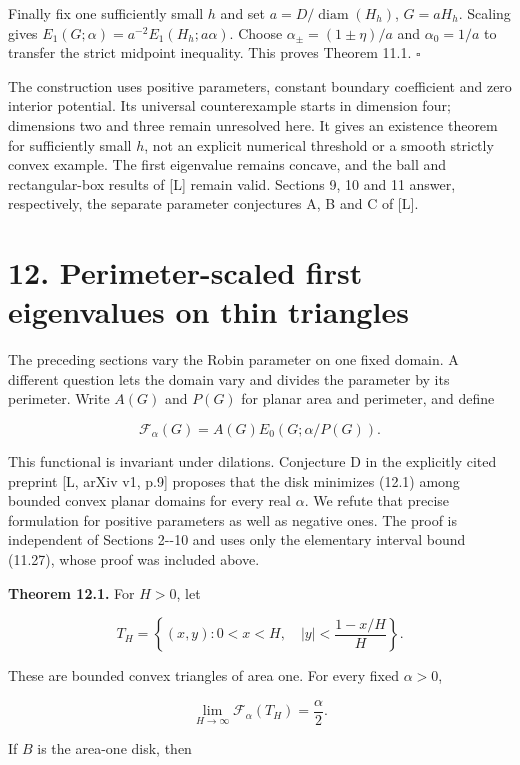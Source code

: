 \documentclass[11pt]{article}
\begin{document}
Finally fix one sufficiently small \(h\) and set
\(a=D/\operatorname{diam}(H_h)\), \(G=aH_h\). Scaling gives
\(E_1(G;\alpha)=a^{-2}E_1(H_h;a\alpha)\). Choose
\(\alpha_\pm=(1\pm\eta)/a\) and \(\alpha_0=1/a\) to transfer the strict
midpoint inequality. This proves Theorem 11.1. \(\square\)

The construction uses positive parameters, constant boundary coefficient
and zero interior potential. Its universal counterexample starts in
dimension four; dimensions two and three remain unresolved here. It
gives an existence theorem for sufficiently small \(h\), not an explicit
numerical threshold or a smooth strictly convex example. The first
eigenvalue remains concave, and the ball and rectangular-box results of
{[}L{]} remain valid. Sections 9, 10 and 11 answer, respectively, the
separate parameter conjectures A, B and C of {[}L{]}.

\section{12. Perimeter-scaled first eigenvalues on thin
triangles}\label{perimeter-scaled-first-eigenvalues-on-thin-triangles}

The preceding sections vary the Robin parameter on one fixed domain. A
different question lets the domain vary and divides the parameter by its
perimeter. Write \(A(G)\) and \(P(G)\) for planar area and perimeter,
and define

\[
\mathcal F_\alpha(G)=A(G)E_0(G;\alpha/P(G)).
\tag{12.1}
\]

This functional is invariant under dilations. Conjecture D in the
explicitly cited preprint {[}L, arXiv v1, p.9{]} proposes that the disk
minimizes (12.1) among bounded convex planar domains for every real
\(\alpha\). We refute that precise formulation for positive parameters
as well as negative ones. The proof is independent of Sections 2-\/-10
and uses only the elementary interval bound (11.27), whose proof was
included above.

\textbf{Theorem 12.1.} For \(H>0\), let

\[
T_H=\left\{(x,y):0<x<H,\quad |y|<\frac{1-x/H}{H}\right\}.
\tag{12.2}
\]

These are bounded convex triangles of area one. For every fixed
\(\alpha>0\),

\[
\lim_{H\to\infty}\mathcal F_\alpha(T_H)=\frac\alpha2.
\tag{12.3}
\]

If \(B\) is the area-one disk, then
\end{document}
